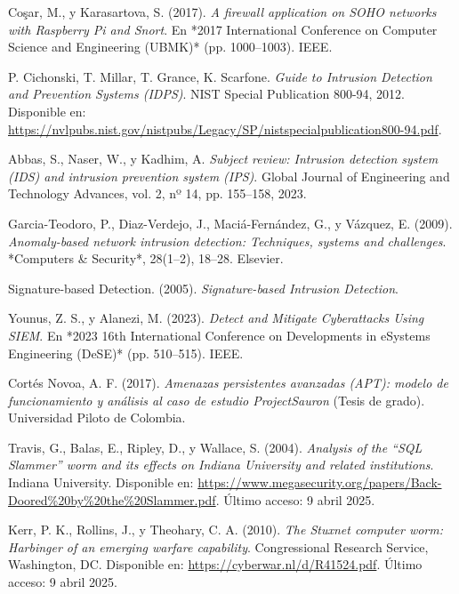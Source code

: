 \documentclass[11pt,a4paper,twoside]{report}
\begin{document}
\begin{thebibliography}{35}
	Coşar, M., y Karasartova, S. (2017). \textit{A firewall application on SOHO networks with Raspberry Pi and Snort}. En *2017 International Conference on Computer Science and Engineering (UBMK)* (pp. 1000--1003). IEEE.
	
	P. Cichonski, T. Millar, T. Grance, K. Scarfone. \textit{Guide to Intrusion Detection and Prevention Systems (IDPS)}. NIST Special Publication 800-94, 2012. Disponible en: \url{https://nvlpubs.nist.gov/nistpubs/Legacy/SP/nistspecialpublication800-94.pdf}.
	
	Abbas, S., Naser, W., y Kadhim, A. \textit{Subject review: Intrusion detection system (IDS) and intrusion prevention system (IPS)}. Global Journal of Engineering and Technology Advances, vol. 2, nº 14, pp. 155–158, 2023.
	
	Garcia-Teodoro, P., Diaz-Verdejo, J., Maciá-Fernández, G., y Vázquez, E. (2009). \textit{Anomaly-based network intrusion detection: Techniques, systems and challenges}. *Computers \& Security*, 28(1–2), 18--28. Elsevier.
	
	
	Signature-based Detection. (2005). \textit{Signature-based Intrusion Detection}.
	
	Younus, Z. S., y Alanezi, M. (2023). \textit{Detect and Mitigate Cyberattacks Using SIEM}. En *2023 16th International Conference on Developments in eSystems Engineering (DeSE)* (pp. 510--515). IEEE.
	
	Cortés Novoa, A. F. (2017). \textit{Amenazas persistentes avanzadas (APT): modelo de funcionamiento y análisis al caso de estudio ProjectSauron} (Tesis de grado). Universidad Piloto de Colombia.
	
	Travis, G., Balas, E., Ripley, D., y Wallace, S. (2004). \textit{Analysis of the “SQL Slammer” worm and its effects on Indiana University and related institutions}. Indiana University. Disponible en: \url{https://www.megasecurity.org/papers/Back-Doored%20by%20the%20Slammer.pdf}. Último acceso: 9 abril 2025.
	
	Kerr, P. K., Rollins, J., y Theohary, C. A. (2010). \textit{The Stuxnet computer worm: Harbinger of an emerging warfare capability}. Congressional Research Service, Washington, DC. Disponible en: \url{https://cyberwar.nl/d/R41524.pdf}. Último acceso: 9 abril 2025.
	

\end{thebibliography}
\end{document}
